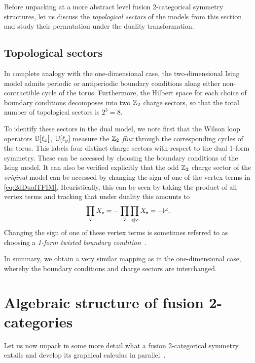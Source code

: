 Before unpacking at a more abstract level fusion 2-categorical symmetry structures, let us discuss the \emph{topological sectors} of the models from this section and study their permutation under the duality transformation.
\subsection{Topological sectors}
In complete analogy with the one-dimensional case, the two-dimensional Ising model admits periodic or antiperiodic boundary conditions along either non-contractible cycle of the torus. Furthermore, the Hilbert space for each choice of boundary conditions decomposes into two $\mathbb Z_2$ charge sectors, so that the total number of topological sectors is $2^3=8$.

To identify these sectors in the dual model, we note first that the Wilson loop operators $\mathbb U[\ell_x]$, $\mathbb U[\ell_y]$ measure the $\mathbb Z_2$ \emph{flux} through the corresponding cycles of the torus. This labels four distinct charge sectors with respect to the dual 1-form symmetry. These can be accessed by choosing the boundary conditions of the Ising model. It can also be verified explicitly that the odd $\mathbb Z_2$ charge sector of the \emph{original} model can be accessed by changing the sign of one of the vertex terms in \cref{eq:2dDualTFIM}. Heuristically, this can be seen by taking the product of all vertex terms and tracking that under duality this amounts to
\begin{equation}
	\prod_{\mathsf{v}} X_{\mathsf{v}} = -\prod_{\mathsf{v}} \prod_{\mathsf{e}|\mathsf{v}} X_{\mathsf{e}} = -\mathbb 1.
\end{equation}
Changing the sign of one of these vertex terms is sometimes referred to as choosing a \emph{1-form twisted boundary condition}~\cite{Moradi2022,Moradi2023}. 

In summary, we obtain a very similar mapping as in the one-dimensional case, whereby the boundary conditions and charge sectors are interchanged.
\section{Algebraic structure of fusion 2-categories}
Let us now unpack in some more detail what a fusion 2-categorical symmetry entails and develop its graphical calculus in parallel~\cite{Douglas2018,Delcamp2021}.
